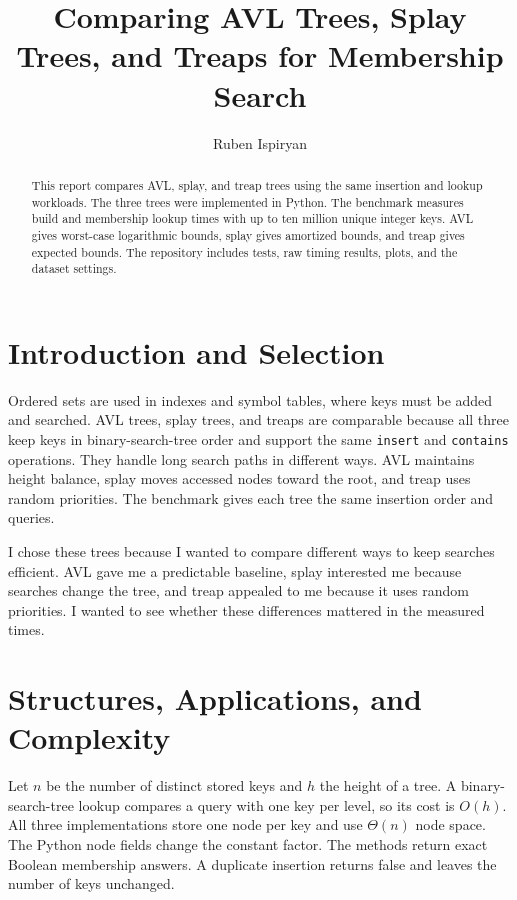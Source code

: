\documentclass[acmsmall,nonacm]{acmart}
\begin{document}
\title{Comparing AVL Trees, Splay Trees, and Treaps for Membership Search}
\author{Ruben Ispiryan}
\authorsaddresses{}

\begin{abstract}
This report compares AVL, splay, and treap trees using the same insertion and lookup workloads. The three trees were implemented in Python. The benchmark measures build and membership lookup times with up to ten million unique integer keys. AVL gives worst-case logarithmic bounds, splay gives amortized bounds, and treap gives expected bounds. The repository includes tests, raw timing results, plots, and the dataset settings.
\end{abstract}
\maketitle

\section{Introduction and Selection}
Ordered sets are used in indexes and symbol tables, where keys must be added and searched. AVL trees, splay trees, and treaps are comparable because all three keep keys in binary-search-tree order and support the same \texttt{insert} and \texttt{contains} operations. They handle long search paths in different ways. AVL maintains height balance, splay moves accessed nodes toward the root, and treap uses random priorities. The benchmark gives each tree the same insertion order and queries.

I chose these trees because I wanted to compare different ways to keep searches efficient. AVL gave me a predictable baseline, splay interested me because searches change the tree, and treap appealed to me because it uses random priorities. I wanted to see whether these differences mattered in the measured times.

\section{Structures, Applications, and Complexity}
Let $n$ be the number of distinct stored keys and $h$ the height of a tree. A binary-search-tree lookup compares a query with one key per level, so its cost is $O(h)$. All three implementations store one node per key and use $\Theta(n)$ node space. The Python node fields change the constant factor. The methods return exact Boolean membership answers. A duplicate insertion returns false and leaves the number of keys unchanged.
\end{document}
